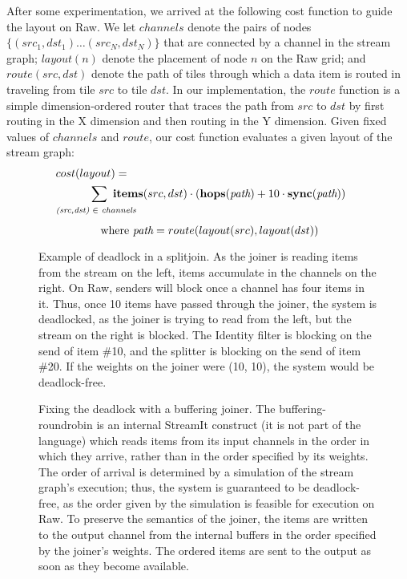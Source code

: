 After some experimentation, we arrived at the following cost function
to guide the layout on Raw.  We let $channels$ denote the pairs of
nodes $\{(src_1, dst_1) \dots (src_N, dst_N)\}$ that are connected by
a channel in the stream graph; $layout(n)$ denote the placement of
node $n$ on the Raw grid; and \\ $route(src, dst)$ denote the path of
tiles through which a data item is routed in traveling from tile $src$
to tile $dst$.  In our implementation, the $route$ function is a
simple dimension-ordered router that traces the path from $src$ to
$dst$ by first routing in the X dimension and then routing in the Y
dimension.  Given fixed values of $channels$ and $route$, our cost
function evaluates a given layout of the stream graph:
\begin{align*}
& cost(layout) = & ~ \\ 
& ~~~~~~~~~\sum ~ {\bf items}(src,dst) \cdot \left( {\bf hops}(\mt{path})
   + 10 \cdot {\bf sync}(\mt{path}) \right) \\
  & \raisebox{4pt}[4pt]{\scriptsize {\it (src,dst)} $\in$ {\it channels}} \\
  & ~~~~~~~~~~~~\mbox{where } \mt{path} = route(layout(src), layout(dst))
\end{align*}

\begin{figure}
\centering
{}
\caption{\protect\small Example of deadlock in a splitjoin.  As the
joiner is reading items from the stream on the left, items accumulate
in the channels on the right.  On Raw, senders will block once a
channel has four items in it.  Thus, once 10 items have passed through
the joiner, the system is deadlocked, as the joiner is trying to read
from the left, but the stream on the right is blocked.  The Identity
filter is blocking on the send of item \#10, and the splitter is
blocking on the send of item \#20.  If the weights on the joiner were
(10, 10), the system would be deadlock-free.
\protect\label{fig:joiner-dead}}

\vspace{48pt}

\caption{\protect\small Fixing the deadlock with a buffering joiner.
The buffering-roundrobin is an internal StreamIt construct (it is not
part of the language) which reads items from its input channels in the
order in which they arrive, rather than in the order specified by its
weights.  The order of arrival is determined by a simulation of the
stream graph's execution; thus, the system is guaranteed to be
deadlock-free, as the order given by the simulation is feasible for
execution on Raw.  To preserve the semantics of the joiner, the items
are written to the output channel from the internal buffers in the
order specified by the joiner's weights.  The ordered items are sent
to the output as soon as they become available.
\protect\label{fig:joiner-live}}
\end{figure}

